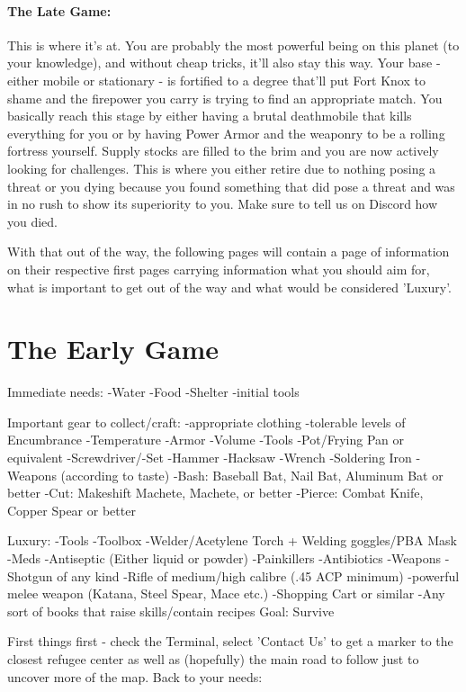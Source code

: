 \paragraph{The Late Game:}
This is where it's at. You are probably the most powerful being on this planet (to your knowledge), and without cheap tricks, it'll also stay this way. Your base - either mobile or stationary - is fortified to a degree that'll put Fort Knox to shame and the firepower you carry is trying to find an appropriate match. You basically reach this stage by either having a brutal deathmobile that kills everything for you or by having Power Armor and the weaponry to be a rolling fortress yourself. Supply stocks are filled to the brim and you are now actively looking for challenges. This is where you either retire due to nothing posing a threat or you dying because you found something that did pose a threat and was in no rush to show its superiority to you. Make sure to tell us on Discord how you died.

With that out of the way, the following pages will contain a page of information on their respective first pages carrying information what you should aim for, what is important to get out of the way and what would be considered 'Luxury'.

\section{The Early Game}
Immediate needs:
-Water
-Food
-Shelter
-initial tools

Important gear to collect/craft:
-appropriate clothing
	-tolerable levels of Encumbrance
-Temperature
-Armor
-Volume
-Tools
	-Pot/Frying Pan or equivalent
-Screwdriver/-Set
-Hammer
-Hacksaw
-Wrench
-Soldering Iron
-Weapons (according to taste)
	-Bash: Baseball Bat, Nail Bat, Aluminum Bat or better
	-Cut: Makeshift Machete, Machete, or better
	-Pierce: Combat Knife, Copper Spear or better

Luxury:
-Tools
	-Toolbox
	-Welder/Acetylene Torch + Welding goggles/PBA Mask
-Meds
	-Antiseptic (Either liquid or powder)
	-Painkillers
	-Antibiotics
-Weapons
	-Shotgun of any kind
	-Rifle of medium/high calibre (.45 ACP minimum)
	-powerful melee weapon (Katana, Steel Spear, Mace etc.)
-Shopping Cart or similar
-Any sort of books that raise skills/contain recipes
Goal: Survive

First things first - check the Terminal, select 'Contact Us' to get a marker to the closest refugee center as well as (hopefully) the main road to follow just to uncover more of the map. Back to your needs:

